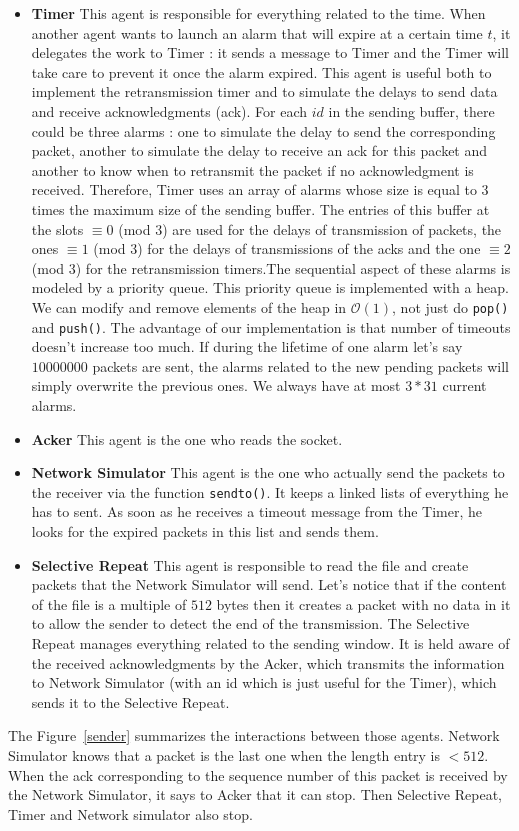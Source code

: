 \documentclass[11pt,a4paper]{article}
\begin{document}
\begin{itemize}
\item \textbf{Timer} This agent is responsible for everything related to the time. When another agent wants to launch an alarm that will expire at a certain time $t$, it delegates the work to Timer : it sends a message to Timer and the Timer will take care to prevent it once the alarm expired. This agent is useful both to implement the retransmission timer and to simulate the delays to send data and receive acknowledgments (ack). For each $id$ in the sending buffer, there could be three alarms : one to simulate the delay to send the corresponding packet, another to simulate the delay to receive an ack for this packet and another to know when to retransmit the packet if no acknowledgment is received. Therefore, Timer uses an array of alarms whose size is equal to 3 times the maximum size of the sending buffer. The entries of this buffer at the slots $\equiv 0$ (mod $3$) are used for the delays of transmission of packets, the ones $\equiv 1$ (mod $3$) for the delays of transmissions of the acks and the one $\equiv 2$ (mod $3$) for the retransmission timers.The sequential aspect of these alarms is modeled by a priority queue. This priority queue is implemented with a heap. We can modify and remove elements of the heap in $\mathcal{O}(1)$, not just do \texttt{pop()} and \texttt{push()}. The advantage of our implementation is that number of timeouts doesn't increase too much. If during the lifetime of one alarm let's say $10000000$ packets are sent, the alarms related to the new pending packets will simply overwrite the previous ones. We always have at most $3*31$ current alarms.
\item \textbf{Acker} This agent is the one who reads the socket. 
\item \textbf{Network Simulator} This agent is the one who actually send the packets to the receiver via the function \texttt{sendto()}. It keeps a linked lists of everything he has to sent. As soon as he receives a timeout message from the Timer, he looks for the expired packets in this list and sends them.
\item \textbf{Selective Repeat}  This agent is responsible to read the file and create packets that the Network Simulator will send. Let's notice that if the content of the file is a multiple of $512$ bytes then it creates a packet with no data in it to allow the sender to detect the end of the transmission. The Selective Repeat manages everything related to the sending window. It is held aware of the received acknowledgments by the Acker, which transmits the information to Network Simulator (with an id which is just useful for the Timer), which sends it to the Selective Repeat.
\end{itemize}
The Figure~\ref{sender} summarizes the interactions between those agents. Network Simulator knows that a packet is the last one when the length entry is $< 512$. When the ack corresponding to the sequence number of this packet is received by the Network Simulator, it says to Acker that it can stop. Then Selective Repeat, Timer and Network simulator also stop.
\end{document}
